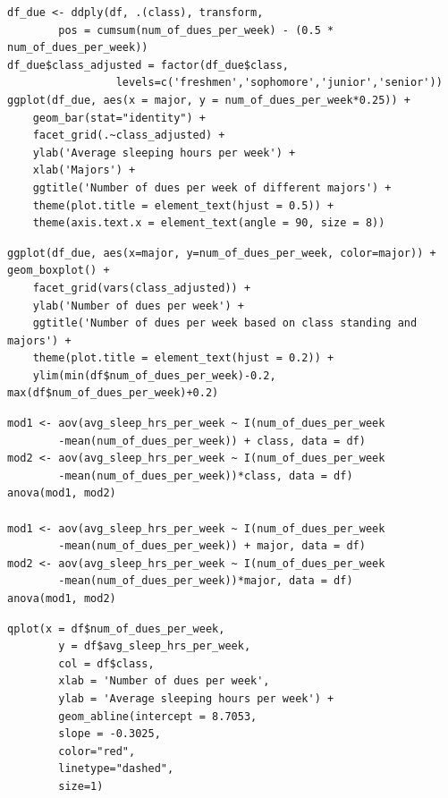 \documentclass{article} %
\begin{document}
\lstset{language=R}
\lstset{frame=lines}
\lstset{basicstyle=\footnotesize}
\begin{lstlisting}
df_due <- ddply(df, .(class), transform, 
		pos = cumsum(num_of_dues_per_week) - (0.5 * num_of_dues_per_week)) 
df_due$class_adjusted = factor(df_due$class,
				 levels=c('freshmen','sophomore','junior','senior'))
ggplot(df_due, aes(x = major, y = num_of_dues_per_week*0.25)) + 
	geom_bar(stat="identity") + 
	facet_grid(.~class_adjusted) +
	ylab('Average sleeping hours per week') + 
	xlab('Majors') +
	ggtitle('Number of dues per week of different majors') +
	theme(plot.title = element_text(hjust = 0.5)) +
	theme(axis.text.x = element_text(angle = 90, size = 8))
\end{lstlisting}


\lstset{language=R}
\lstset{frame=lines}
\lstset{basicstyle=\footnotesize}
\begin{lstlisting}
ggplot(df_due, aes(x=major, y=num_of_dues_per_week, color=major)) +
geom_boxplot() +
	facet_grid(vars(class_adjusted)) +
	ylab('Number of dues per week') +
	ggtitle('Number of dues per week based on class standing and majors') +
	theme(plot.title = element_text(hjust = 0.2)) +
	ylim(min(df$num_of_dues_per_week)-0.2, max(df$num_of_dues_per_week)+0.2)
\end{lstlisting}

\lstset{language=R}
\lstset{frame=lines}
\lstset{basicstyle=\footnotesize}
\begin{lstlisting}
mod1 <- aov(avg_sleep_hrs_per_week ~ I(num_of_dues_per_week
		-mean(num_of_dues_per_week)) + class, data = df)
mod2 <- aov(avg_sleep_hrs_per_week ~ I(num_of_dues_per_week
		-mean(num_of_dues_per_week))*class, data = df)
anova(mod1, mod2)

mod1 <- aov(avg_sleep_hrs_per_week ~ I(num_of_dues_per_week
		-mean(num_of_dues_per_week)) + major, data = df)
mod2 <- aov(avg_sleep_hrs_per_week ~ I(num_of_dues_per_week
		-mean(num_of_dues_per_week))*major, data = df)
anova(mod1, mod2)
\end{lstlisting}

\lstset{language=R}
\lstset{frame=lines}
\lstset{basicstyle=\footnotesize}
\begin{lstlisting}
qplot(x = df$num_of_dues_per_week, 
		y = df$avg_sleep_hrs_per_week, 
		col = df$class,
		xlab = 'Number of dues per week',
		ylab = 'Average sleeping hours per week') + 
		geom_abline(intercept = 8.7053, 
		slope = -0.3025, 
		color="red", 
		linetype="dashed", 
		size=1)
\end{lstlisting}
\end{document}
